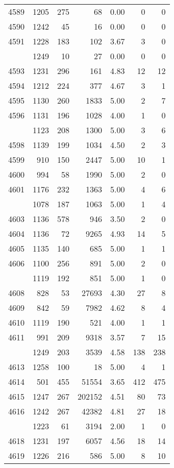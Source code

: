 \documentclass[
]{article}
\begin{document}
\begin{table}
\begin{tabular}[t]{lrrrrrr}
4589 & 1205 & 275 & 68 & 0.00 & 0 & 0\\
4590 & 1242 & 45 & 16 & 0.00 & 0 & 0\\
4591 & 1228 & 183 & 102 & 3.67 & 3 & 0\\
\addlinespace
4592 & 1249 & 10 & 27 & 0.00 & 0 & 0\\
4593 & 1231 & 296 & 161 & 4.83 & 12 & 12\\
4594 & 1212 & 224 & 377 & 4.67 & 3 & 1\\
4595 & 1130 & 260 & 1833 & 5.00 & 2 & 7\\
4596 & 1131 & 196 & 1028 & 4.00 & 1 & 0\\
\addlinespace
4597 & 1123 & 208 & 1300 & 5.00 & 3 & 6\\
4598 & 1139 & 199 & 1034 & 4.50 & 2 & 3\\
4599 & 910 & 150 & 2447 & 5.00 & 10 & 1\\
4600 & 994 & 58 & 1990 & 5.00 & 2 & 0\\
4601 & 1176 & 232 & 1363 & 5.00 & 4 & 6\\
\addlinespace
4602 & 1078 & 187 & 1063 & 5.00 & 1 & 4\\
4603 & 1136 & 578 & 946 & 3.50 & 2 & 0\\
4604 & 1136 & 72 & 9265 & 4.93 & 14 & 5\\
4605 & 1135 & 140 & 685 & 5.00 & 1 & 1\\
4606 & 1100 & 256 & 891 & 5.00 & 2 & 0\\
\addlinespace
4607 & 1119 & 192 & 851 & 5.00 & 1 & 0\\
4608 & 828 & 53 & 27693 & 4.30 & 27 & 8\\
4609 & 842 & 59 & 7982 & 4.62 & 8 & 4\\
4610 & 1119 & 190 & 521 & 4.00 & 1 & 1\\
4611 & 991 & 209 & 9318 & 3.57 & 7 & 15\\
\addlinespace
4612 & 1249 & 203 & 3539 & 4.58 & 138 & 238\\
4613 & 1258 & 100 & 18 & 5.00 & 4 & 1\\
4614 & 501 & 455 & 51554 & 3.65 & 412 & 475\\
4615 & 1247 & 267 & 202152 & 4.51 & 80 & 73\\
4616 & 1242 & 267 & 42382 & 4.81 & 27 & 18\\
\addlinespace
4617 & 1223 & 61 & 3194 & 2.00 & 1 & 0\\
4618 & 1231 & 197 & 6057 & 4.56 & 18 & 14\\
4619 & 1226 & 216 & 586 & 5.00 & 8 & 10\\

\end{tabular}
\end{table}
\end{document}
